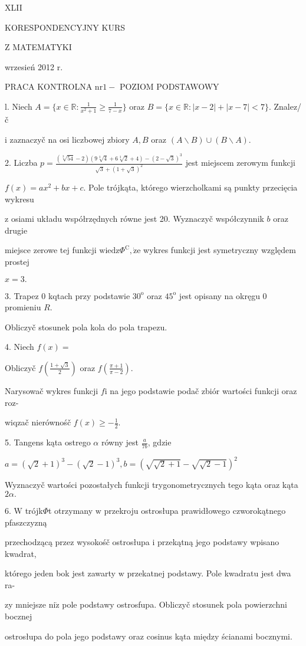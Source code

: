 \documentclass[a4paper,12pt]{article}
\begin{document}
XLII

KORESPONDENCYJNY KURS

Z MATEMATYKI

wrzesień 2012 r.

PRACA KONTROLNA $\mathrm{n}\mathrm{r} 1 -$ POZIOM PODSTAWOWY

l. Niech $A=\displaystyle \{x\in \mathbb{R}:\frac{1}{x^{2}+1}\geq\frac{1}{7-x}\}$ oraz $B=\{x\in \mathbb{R}:|x-2|+|x-7|<7\}$. Znalez/č

$\mathrm{i}$ zaznaczyč na osi liczbowej zbiory $A, B$ oraz $(A\backslash B)\cup(B\backslash A).$

2. Liczba $p=\displaystyle \frac{(\sqrt[3]{54}-2)(9\sqrt[3]{4}+6\sqrt[3]{2}+4)-(2-\sqrt{3})^{3}}{\sqrt{3}+(1+\sqrt{3})^{2}}$ jest miejscem zerowym funkcji

$f(x)=ax^{2}+bx+c$. Pole trójkąta, którego wierzcholkami są punkty przecięcia wykresu

$\mathrm{z}$ osiami układu współrzędnych równe jest 20. Wyznaczyč współczynnik $b$ oraz drugie

miejsce zerowe tej funkcji $\mathrm{w}\mathrm{i}\mathrm{e}\mathrm{d}\mathrm{z}\Phi^{\mathrm{C}}, \dot{\mathrm{z}}\mathrm{e}$ wykres funkcji jest symetryczny względem prostej

$x=3.$

3. Trapez $0$ kqtach przy podstawie $30^{\mathrm{o}}$ oraz $45^{\mathrm{o}}$ jest opisany na okręgu $0$ promieniu $R.$

Obliczyč stosunek pola kola do pola trapezu.

4. Niech $f(x)=$

Obliczyč $f(\displaystyle \frac{1+\sqrt{3}}{2})$ oraz $f(\displaystyle \frac{\pi+1}{\pi-2}).$

Narysowač wykres funkcji $f\mathrm{i}$ na jego podstawie podač zbiór wartości funkcji oraz roz-

wiqzač nierównośč $f(x)\displaystyle \geq-\frac{1}{2}.$

5. Tangens kąta ostrego $\alpha$ równy jest $\displaystyle \frac{a}{7b}$, gdzie

$a=(\sqrt{2}+1)^{3}-(\sqrt{2}-1)^{3},b=(\sqrt{\sqrt{2}+1}-\sqrt{\sqrt{2}-1})^{2}$

Wyznaczyč wartości pozostałych funkcji trygonometrycznych tego kąta oraz kąta $2\alpha.$

6. $\mathrm{W}$ trójk$\Phi$t otrzymany $\mathrm{w}$ przekroju ostrosłupa prawidłowego czworokątnego pfaszczyzną

przechodzącą przez wysokośč ostrosłupa $\mathrm{i}$ przekątną jego podstawy wpisano kwadrat,

którego jeden bok jest zawarty $\mathrm{w}$ przekatnej podstawy. Pole kwadratu jest dwa ra-

zy mniejsze $\mathrm{n}\mathrm{i}\dot{\mathrm{z}}$ pole podstawy ostrosfupa. Obliczyč stosunek pola powierzchni bocznej

ostrosłupa do pola jego podstawy oraz cosinus kąta między ścianami bocznymi.
\end{document}
